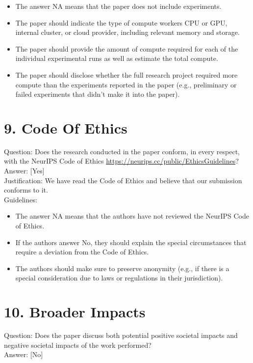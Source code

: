 \documentclass[10pt]{article}
\begin{document}
\begin{itemize}
  \item The answer NA means that the paper does not include experiments.
  \item The paper should indicate the type of compute workers CPU or GPU, internal cluster, or cloud provider, including relevant memory and storage.
  \item The paper should provide the amount of compute required for each of the individual experimental runs as well as estimate the total compute.
  \item The paper should disclose whether the full research project required more compute than the experiments reported in the paper (e.g., preliminary or failed experiments that didn't make it into the paper).
\end{itemize}

\section*{9. Code Of Ethics}
Question: Does the research conducted in the paper conform, in every respect, with the NeurIPS Code of Ethics \href{https://neurips.cc/public/EthicsGuidelines}{https://neurips.cc/public/EthicsGuidelines}?\\[0pt]
Answer: [Yes]\\
Justification: We have read the Code of Ethics and believe that our submission conforms to it.\\
Guidelines:

\begin{itemize}
  \item The answer NA means that the authors have not reviewed the NeurIPS Code of Ethics.
  \item If the authors answer No, they should explain the special circumstances that require a deviation from the Code of Ethics.
  \item The authors should make sure to preserve anonymity (e.g., if there is a special consideration due to laws or regulations in their jurisdiction).
\end{itemize}

\section*{10. Broader Impacts}
Question: Does the paper discuss both potential positive societal impacts and negative societal impacts of the work performed?\\[0pt]
Answer: [No]
\end{document}
